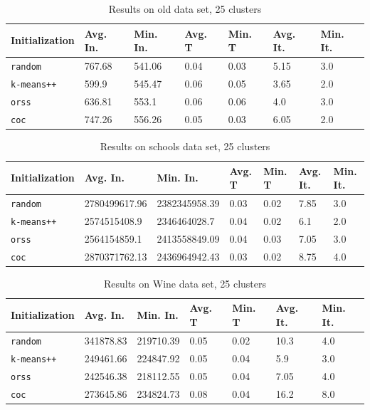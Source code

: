 \documentclass[12pt]{article}
\begin{document}
		\begin{table}[p]
			\begin{center}
				\begin{tabular}{|l|l|l|l|l|l|l|}
					\hline
					Initialization & Avg. In. & Min. In. & Avg. T & Min. T & Avg. It. & Min. It.\\\hline
					\texttt{random} & 767.68 & 541.06 & 0.04 & 0.03 & 5.15 & 3.0\\\hline
					\texttt{k-means++} & 599.9 & 545.47 & 0.06 & 0.05 & 3.65 & 2.0\\\hline
					\texttt{orss} & 636.81 & 553.1 & 0.06 & 0.06 & 4.0 & 3.0\\\hline
					\texttt{coc} & 747.26 & 556.26 & 0.05 & 0.03 & 6.05 & 2.0\\\hline
				\end{tabular}
				\caption{Results on old data set, 25 clusters}
				\label{tbl:old25}
			\end{center}
		\end{table}

		\begin{table}[p]
			\begin{center}
				\begin{tabular}{|l|l|l|l|l|l|l|}
					\hline
					Initialization & Avg. In. & Min. In. & Avg. T & Min. T & Avg. It. & Min. It.\\\hline
					\texttt{random} & 2780499617.96 & 2382345958.39 & 0.03 & 0.02 & 7.85 & 3.0\\\hline
					\texttt{k-means++} & 2574515408.9 & 2346464028.7 & 0.04 & 0.02 & 6.1 & 2.0\\\hline
					\texttt{orss} & 2564154859.1 & 2413558849.09 & 0.04 & 0.03 & 7.05 & 3.0\\\hline
					\texttt{coc} & 2870371762.13 & 2436964942.43 & 0.03 & 0.02 & 8.75 & 4.0\\\hline
				\end{tabular}
				\caption{Results on schools data set, 25 clusters}
				\label{tbl:schools25}
			\end{center}
		\end{table}

		\begin{table}[p]
			\begin{center}
				\begin{tabular}{|l|l|l|l|l|l|l|}
					\hline
					Initialization & Avg. In. & Min. In. & Avg. T & Min. T & Avg. It. & Min. It.\\\hline
					\texttt{random} & 341878.83 & 219710.39 & 0.05 & 0.02 & 10.3 & 4.0\\\hline
					\texttt{k-means++} & 249461.66 & 224847.92 & 0.05 & 0.04 & 5.9 & 3.0\\\hline
					\texttt{orss} & 242546.38 & 218112.55 & 0.05 & 0.04 & 7.05 & 4.0\\\hline
					\texttt{coc} & 273645.86 & 234824.73 & 0.08 & 0.04 & 16.2 & 8.0\\\hline
				\end{tabular}
				\caption{Results on Wine data set, 25 clusters}
				\label{tbl:Wine25}
			\end{center}
		\end{table}
\end{document}
